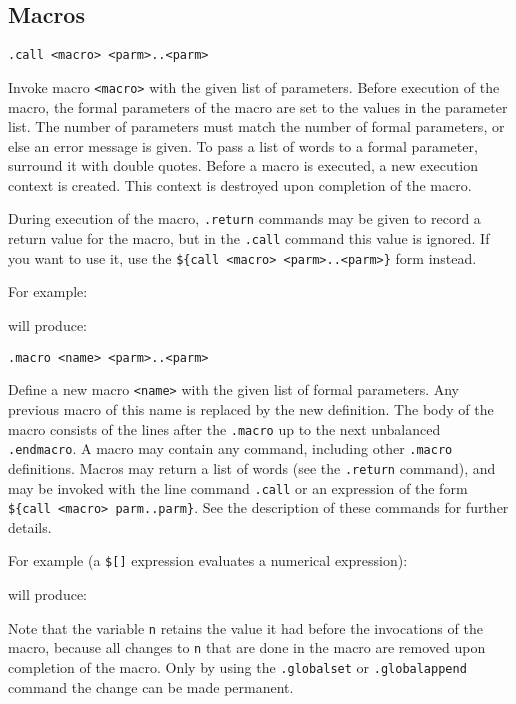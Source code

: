 \subsection{Macros}
\begin{verbatim}
.call <macro> <parm>..<parm>
\end{verbatim}
\begin{desc}
Invoke macro \verb+<macro>+ with the given list of parameters. Before
execution of the macro, the formal parameters of the macro are set to
the values in the parameter list. The number of parameters must match the
number of formal parameters, or else an error message is given. To pass
a list of words to a formal parameter, surround it with double quotes.
Before a macro is executed, a new execution context is created. This
context is destroyed upon completion of the macro.
\par
During execution of the macro, \verb+.return+ commands may be given to
record a return value for the macro, but in the \verb+.call+ command this
value is ignored.  If you want to use it, use the
\verb+${call <macro> <parm>..<parm>}+ form instead.
\par
For example:
\begin{showfile}

\end{showfile}
will produce:
\begin{showfile}

\end{showfile}
\end{desc}
\begin{verbatim}
.macro <name> <parm>..<parm>
\end{verbatim}
\begin{desc}
Define a new macro \verb+<name>+ with the given list of formal parameters.
Any previous macro of this name is replaced by the new definition.
The body of the macro consists of the lines after the
\verb+.macro+ up to the next unbalanced \verb+.endmacro+.
A macro may contain any {\Tm} command, including other \verb+.macro+
definitions.
Macros may return a list of words (see the \verb+.return+ command),
and may be invoked with the line command \verb+.call+ or an expression
of the form \verb+${call <macro> parm..parm}+.
See the description of these commands for further details.
\par
For example (a \verb'$[]' expression evaluates a numerical expression):
\begin{showfile}

\end{showfile}
will produce:
\begin{showfile}

\end{showfile}
Note that the variable \verb'n' retains the value it had before the
invocations of the macro, because all changes to \verb'n' that are
done in the macro are removed upon completion of the macro.
Only by using the \verb'.globalset' or \verb'.globalappend' command
the change can be made permanent.
\end{desc}
